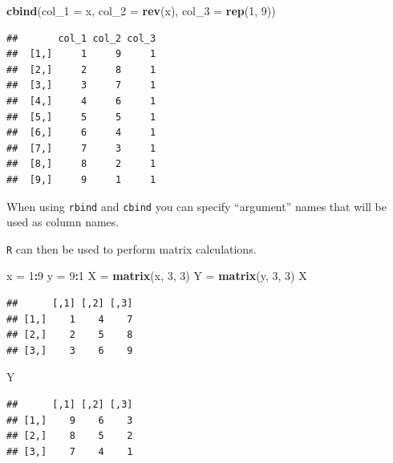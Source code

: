 \documentclass[]{book}
\newenvironment{Shaded}{\begin{snugshade}}{\end{snugshade}}
\newcommand{\KeywordTok}[1]{\textcolor[rgb]{0.13,0.29,0.53}{\textbf{#1}}}
\newcommand{\DataTypeTok}[1]{\textcolor[rgb]{0.13,0.29,0.53}{#1}}
\newcommand{\DecValTok}[1]{\textcolor[rgb]{0.00,0.00,0.81}{#1}}
\newcommand{\StringTok}[1]{\textcolor[rgb]{0.31,0.60,0.02}{#1}}
\newcommand{\OperatorTok}[1]{\textcolor[rgb]{0.81,0.36,0.00}{\textbf{#1}}}
\newcommand{\NormalTok}[1]{#1}
\begin{document}
\begin{Shaded}
\begin{Highlighting}[]
\KeywordTok{cbind}\NormalTok{(}\DataTypeTok{col_1 =}\NormalTok{ x, }\DataTypeTok{col_2 =} \KeywordTok{rev}\NormalTok{(x), }\DataTypeTok{col_3 =} \KeywordTok{rep}\NormalTok{(}\DecValTok{1}\NormalTok{, }\DecValTok{9}\NormalTok{))}
\end{Highlighting}
\end{Shaded}

\begin{verbatim}
##       col_1 col_2 col_3
##  [1,]     1     9     1
##  [2,]     2     8     1
##  [3,]     3     7     1
##  [4,]     4     6     1
##  [5,]     5     5     1
##  [6,]     6     4     1
##  [7,]     7     3     1
##  [8,]     8     2     1
##  [9,]     9     1     1
\end{verbatim}

When using \texttt{rbind} and \texttt{cbind} you can specify
``argument'' names that will be used as column names.

\texttt{R} can then be used to perform matrix calculations.

\begin{Shaded}
\begin{Highlighting}[]
\NormalTok{x =}\StringTok{ }\DecValTok{1}\OperatorTok{:}\DecValTok{9}
\NormalTok{y =}\StringTok{ }\DecValTok{9}\OperatorTok{:}\DecValTok{1}
\NormalTok{X =}\StringTok{ }\KeywordTok{matrix}\NormalTok{(x, }\DecValTok{3}\NormalTok{, }\DecValTok{3}\NormalTok{)}
\NormalTok{Y =}\StringTok{ }\KeywordTok{matrix}\NormalTok{(y, }\DecValTok{3}\NormalTok{, }\DecValTok{3}\NormalTok{)}
\NormalTok{X}
\end{Highlighting}
\end{Shaded}

\begin{verbatim}
##      [,1] [,2] [,3]
## [1,]    1    4    7
## [2,]    2    5    8
## [3,]    3    6    9
\end{verbatim}

\begin{Shaded}
\begin{Highlighting}[]
\NormalTok{Y}
\end{Highlighting}
\end{Shaded}

\begin{verbatim}
##      [,1] [,2] [,3]
## [1,]    9    6    3
## [2,]    8    5    2
## [3,]    7    4    1
\end{verbatim}
\end{document}
